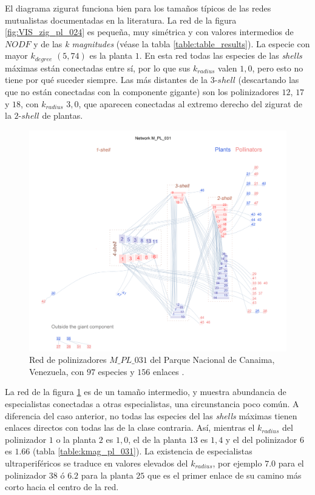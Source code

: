 El diagrama zigurat funciona bien para los tamaños típicos de las redes mutualistas documentadas en la literatura. La red de la figura \ref{fig:VIS_zig_pl_024} es pequeña, muy simétrica y con valores intermedios de $NODF$ y de las \textit{k magnitudes} (véase la tabla \ref{table:table_results}). La especie con mayor $k_{degree}$ $(5,74)$ es la planta $1$. En esta red todas las especies de las \textit{shells} máximas están conectadas entre sí, por lo que sus $k_{radius}$ valen $1,0$, pero esto no tiene por qué suceder siempre. Las más distantes de la $3$-$shell$ (descartando las que no están conectadas con la componente gigante) son los polinizadores $12$, $17$ y $18$, con  $k_{radius}$ $3,0$, que aparecen conectadas al extremo derecho del zigurat de la $2$-$shell$ de plantas.

\begin{figure}[h!]
\centering
\includegraphics[scale=1]{Figures/VIS_M_PL_031_ziggurat.png}
\caption {Red de polinizadores $M\_PL\_031$ del Parque Nacional de Canaima, Venezuela, con $97$ especies y $156$ enlaces \cite{ramirez1989biologia}.}
\label{fig:VIS_M_PL_031_ziggurat}
\end{figure}

La red de la figura \ref{fig:VIS_M_PL_031_ziggurat} es de un tamaño intermedio, y muestra abundancia de especialistas conectadas a otras especialistas, una circunstancia poco común. A diferencia del caso anterior, no todas las especies del las \textit{shells} máximas tienen enlaces directos con todas las de la clase contraria. Así, mientras el $k_{radius}$ del polinizador $1$ o la planta $2$ es $1,0$, el de la planta $13$ es $1,4$ y el del polinizador $6$ es $1.66$ (tabla \ref{table:kmag_pl_031}). La existencia de especialistas ultraperiféricos se traduce en valores elevados del $k_{radius}$, por ejemplo $7.0$ para el polinizador $38$ ó $6.2$ para la planta $25$ que es el primer enlace de su camino más corto hacia el centro de la red.

